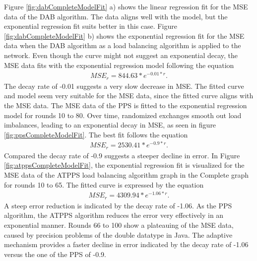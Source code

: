 Figure \ref{fig:dabCompleteModelFit} a) shows the linear regression fit for the MSE data of the DAB algorithm. The data aligns well with the model, but the exponential regression fit suits better in this case. Figure \ref{fig:dabCompleteModelFit} b) shows the exponential regression fit for the MSE data when the DAB algorithm as a load balancing algorithm is applied to the network. Even though the curve might not suggest an exponential decay, the MSE data fits with the exponential regression model following the equation
\begin{align}
    MSE_r=844.63*e^{-0.01*r}.    
\end{align}
The decay rate of -0.01 suggests a very slow decrease in MSE. The fitted curve and model seem very suitable for the MSE data, since the fitted curve aligns with the MSE data. The MSE data of the PPS is fitted to the exponential regression model for rounds 10 to 80. Over time, randomized exchanges smooth out load imbalances, leading to an exponential decay in MSE, as seen in figure \ref{fig:ppsCompleteModelFit}. The best fit follows the equation
\begin{align}
    MSE_r=2530.41*e^{-0.9*r}.    
\end{align}
Compared the decay rate of -0.9 suggests a steeper decline in error. In Figure \ref{fig:atppsCompleteModelFit}, the exponential regression fit is visualized for the MSE data of the ATPPS load balancing algorithm graph in the Complete graph for rounds 10 to 65. The fitted curve is expressed by the equation
\begin{align}
    MSE_r=4309.94*e^{-1.06*r}.    
\end{align}
A steep error reduction is indicated by the decay rate of -1.06. As the PPS algorithm, the ATPPS algorithm reduces the error very effectively in an exponential manner. Rounds 66 to 100 show a plateauing of the MSE data, caused by precision problems of the double datatype in Java. The adaptive mechanism provides a faster decline in error indicated by the decay rate of -1.06 versus the one of the PPS of -0.9.

